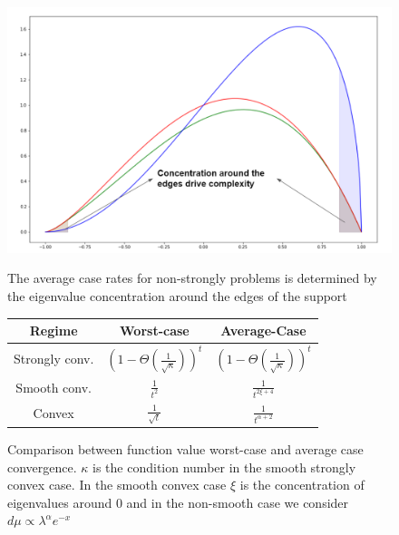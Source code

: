 \documentclass{article}
\begin{document}
\begin{figure}[!htb]
\centering
\begin{minipage}{0.45\textwidth} \vspace{0 pt} %
\includegraphics[width = 1.0 \linewidth]{imgs/concentration.PNG}

\begin{small}
\caption{The average case rates for non-strongly problems is determined by the eigenvalue concentration around the edges of the support }
\end{small}
\end{minipage}%
\hfill
\begin{minipage}{0.45 \textwidth} \vspace{0 cm } %
\begin{small}
\captionsetup{type=table} %
    \begin{tabular}{c|c|c}
         Regime&Worst-case& Average-Case  \\
         \hline
         Strongly conv. & $\left(1-\Theta(\frac{1}{\sqrt{\kappa}})\right)^t$ &
         $\left(1-\Theta(\frac{1}{\sqrt{\kappa}})\right)^t$\\ 
         \hline
         Smooth conv. & $\frac{1}{t^2}$ & $\frac{1}{t^{2\xi+4}}$\\
         \hline
          Convex& $\frac{1}{\sqrt{t}}$ & $\frac{1}{t^{\alpha+2}}$
    \end{tabular}
    \vspace{ 0.5 cm}
    \caption{Comparison between function value worst-case and average case convergence. $\kappa$ is the condition number in the smooth strongly convex case. In the smooth convex case $\xi$ is the concentration of eigenvalues around $0$ and in the non-smooth case we consider $d\mu\propto \lambda^\alpha e^{-x}$ }\label{table: rates}

\end{small}

\end{minipage}


\end{figure}
\end{document}
